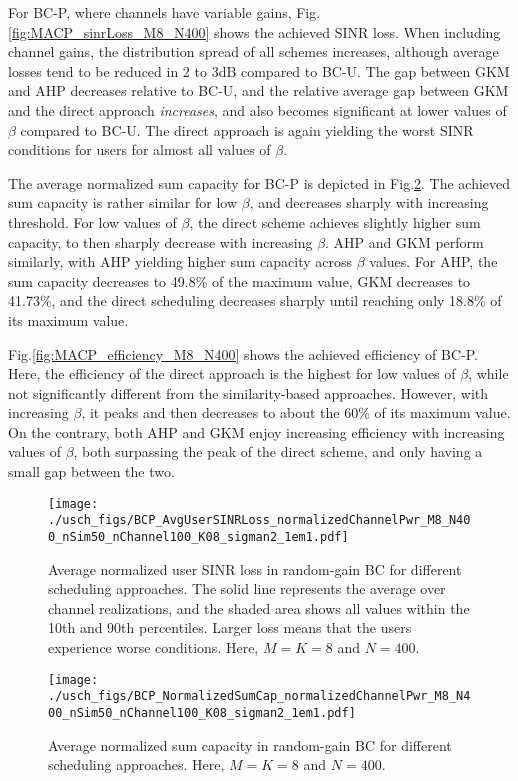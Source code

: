 For BC-P, where channels have variable gains, Fig.\ref{fig:MACP_sinrLoss_M8_N400} shows the achieved SINR loss. When including channel gains, the distribution spread of all schemes increases, although average losses tend to be reduced in 2 to 3dB compared to BC-U. The gap between GKM and AHP decreases relative to BC-U, and the relative average gap between GKM and the direct approach \emph{increases}, and also becomes significant at lower values of $\beta$ compared to BC-U. The direct approach is again yielding the worst SINR conditions for users for almost all values of $\beta$. 

The average normalized sum capacity for BC-P is depicted in Fig.\ref{fig:BCP_sumcapacity_M8_N400}. The achieved sum capacity is rather similar for low $\beta$, and decreases sharply with increasing threshold. For low values of $\beta$, the direct scheme achieves slightly higher sum capacity, to then sharply decrease with increasing $\beta$. AHP and GKM perform similarly, with AHP yielding higher sum capacity across $\beta$ values. For AHP, the sum capacity decreases to 49.8\% of the maximum value, GKM decreases to 41.73\%, and the direct scheduling decreases sharply until reaching only 18.8\% of its maximum value.

Fig.\ref{fig:MACP_efficiency_M8_N400} shows the achieved efficiency of BC-P. Here, the efficiency of the direct approach is the highest for low values of $\beta$, while not significantly different from the similarity-based approaches. However, with increasing $\beta$, it peaks and then decreases to about the 60\% of its maximum value. On the contrary, both AHP and GKM enjoy increasing efficiency with increasing values of $\beta$, both surpassing the peak of the direct scheme, and only having a small gap between the two.

\begin{figure}[tbp]
	\centering
	\texttt{[image: ./usch\_figs/BCP\_AvgUserSINRLoss\_normalizedChannelPwr\_M8\_N400\_nSim50\_nChannel100\_K08\_sigman2\_1em1.pdf]}
	\caption{Average normalized user SINR loss in random-gain BC for different scheduling approaches. The solid line represents the average over channel realizations, and the shaded area shows all values within the 10th and 90th percentiles. Larger loss means that the users experience worse conditions. Here, $M=K=8$ and $N=400$.}
	\label{fig:BCP_sinrLoss_M8_N400}
\end{figure}

\begin{figure}[tbp]
	\centering
	\texttt{[image: ./usch\_figs/BCP\_NormalizedSumCap\_normalizedChannelPwr\_M8\_N400\_nSim50\_nChannel100\_K08\_sigman2\_1em1.pdf]}
	\caption{Average normalized sum capacity in random-gain BC for different scheduling approaches. Here, $M=K=8$ and $N=400$.}
	\label{fig:BCP_sumcapacity_M8_N400}
\end{figure}


